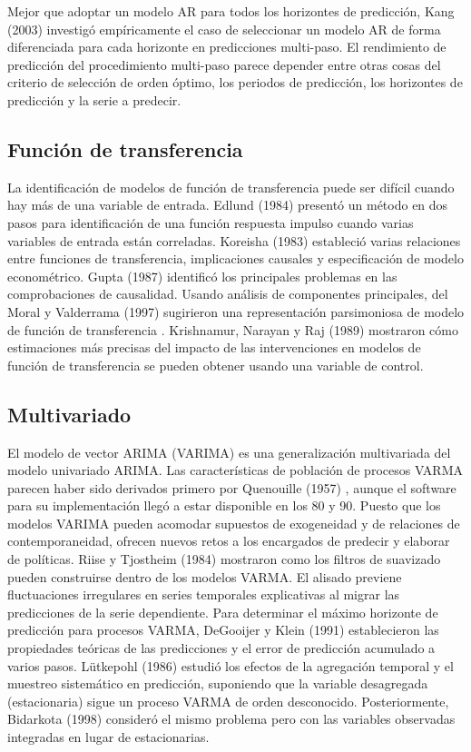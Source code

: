 \documentclass{llncs}
\begin{document}
Mejor que adoptar un modelo AR para todos los horizontes de predicción, Kang (2003) \cite{Kang2003387} investigó empíricamente el caso de seleccionar un modelo AR  de forma diferenciada para cada horizonte en predicciones multi-paso.
El rendimiento de predicción del procedimiento multi-paso parece depender entre otras cosas del criterio de selección de orden óptimo, los periodos de predicción, los horizontes de predicción y la serie a predecir.


\subsection{Función de transferencia}
La identificación de modelos de función de transferencia puede ser difícil cuando hay más de una variable de entrada. Edlund (1984) \cite{Edlund1984297} presentó un método en dos pasos para identificación de una función respuesta impulso cuando varias variables de entrada están correladas. Koreisha (1983) \cite{Koreisha1983151} estableció varias relaciones entre funciones de transferencia, implicaciones causales y especificación de modelo econométrico. Gupta (1987) \cite{Gupta1987195} identificó los principales problemas en las comprobaciones de causalidad. Usando análisis de componentes principales, del Moral y Valderrama (1997) \cite{DelMoral1997237} sugirieron una representación parsimoniosa de  modelo de función de transferencia . Krishnamur, Narayan y Raj (1989) \cite{Krishnamurthi198921} mostraron cómo estimaciones más precisas del impacto de las intervenciones en modelos de función de transferencia se pueden obtener usando una variable de control.

\subsection{Multivariado}
El modelo de vector ARIMA (VARIMA) es una generalización multivariada del modelo univariado ARIMA. Las características de población de procesos VARMA parecen haber sido derivados primero por Quenouille (1957) \cite{Quenouille1957}, aunque el software para su implementación llegó a estar disponible en los 80 y 90. Puesto que los modelos VARIMA pueden acomodar supuestos de exogeneidad y de relaciones de contemporaneidad, ofrecen nuevos retos a los encargados de predecir y elaborar de políticas. Riise y Tjostheim (1984) \cite{Riise1984309} mostraron como los filtros de suavizado pueden construirse dentro de los modelos VARMA. El alisado previene fluctuaciones irregulares en series temporales explicativas al migrar las predicciones de la serie dependiente. Para determinar el máximo horizonte de predicción para procesos VARMA, DeGooijer y Klein (1991) \cite{DeGooijer1992135} establecieron las propiedades teóricas de las predicciones y el error de predicción acumulado a varios pasos. Lütkepohl (1986) \cite{Lutkepohl1986461} estudió los efectos de la agregación temporal y el muestreo sistemático en predicción, suponiendo que la variable desagregada (estacionaria) sigue un proceso VARMA de orden desconocido. Posteriormente, Bidarkota (1998) \cite{Bidarkota1998457} consideró el mismo problema pero con las variables observadas integradas en lugar de estacionarias.
\end{document}

